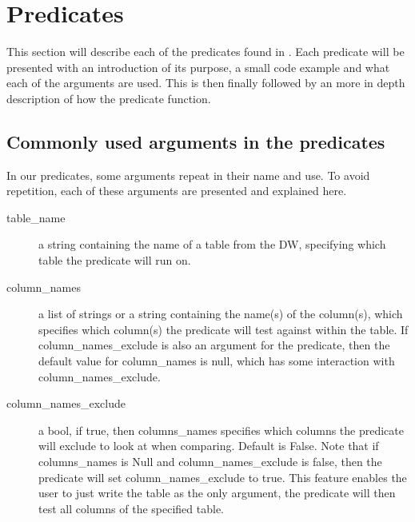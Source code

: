 \section{Predicates}
This section will describe each of the predicates found in \FW. Each predicate will be presented with an introduction of its purpose, a small code example and what each of the arguments are used. This is then finally followed by an more in depth description of how the predicate function.

\subsection{Commonly used arguments in the predicates}
In our predicates, some arguments repeat in their name and use. To avoid repetition, each of these arguments are presented and explained here.

\begin{description}
\item [table\_name] a string containing the name of a table from the DW, specifying which table the predicate will run on.
\item [column\_names] a list of strings or a string containing the name(s) of the column(s), which specifies which column(s) the predicate will test against within the table. If column\_names\_exclude is also an argument for the predicate, then the default value for column\_names is null, which has some interaction with column\_names\_exclude.
\item [column\_names\_exclude] a bool, if true, then columns\_names specifies which columns the predicate will exclude to look at when comparing. Default is False. Note that if columns\_names is Null and column\_names\_exclude is false, then the predicate will set column\_names\_exclude to true. This feature enables the user to just write the table as the only argument, the predicate will then test all columns of the specified table.
\end{description}









